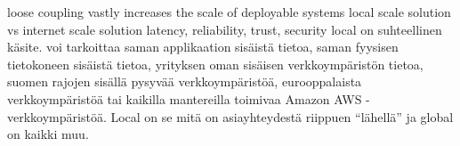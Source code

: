 \documentclass[finnish,gradu]{tktltiki}
\begin{document}
  loose coupling vastly increases the scale of deployable systems
  local scale solution vs internet scale solution
  latency, reliability, trust, security
  local on suhteellinen käsite. voi tarkoittaa saman applikaation sisäistä tietoa, saman fyysisen tietokoneen sisäistä tietoa, yrityksen oman sisäisen verkkoympäristön tietoa, suomen rajojen sisällä pysyvää verkkoympäristöä, eurooppalaista verkkoympäristöä tai kaikilla mantereilla toimivaa Amazon AWS -verkkoympäristöä. Local on se mitä on asiayhteydestä riippuen ``lähellä'' ja global on kaikki muu.


\end{document}
